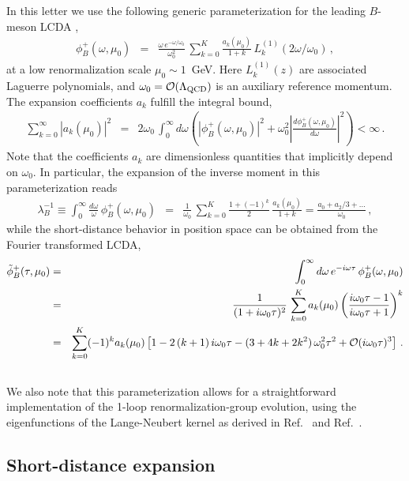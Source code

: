 \documentclass[a4paper,11pt]{article}
\begin{document}
In this letter we use the following generic parameterization for the leading $B$-meson LCDA \cite{Feldmann:2022uok},
\begin{eqnarray}
	\phi_B^+(\omega,\mu_0) &=& 
	\frac{\omega \, e^{-\omega/\omega_0}}{\omega_0^2} 
	\, \sum_{k=0}^K \frac{a_k(\mu_0)}{1+k} \, L_k^{(1)}(2\omega/\omega_0) \,,
 \label{eq:generic}
\end{eqnarray}
at a low renormalization scale $\mu_0 \sim 1$~GeV.
%
Here $L_k^{(1)}(z)$ are associated Laguerre polynomials, and $\omega_0 = {\cal O}(\Lambda_{\rm QCD})$ is an auxiliary reference momentum. The expansion coefficients $a_k$ fulfill the integral bound,
\begin{eqnarray}
	\sum_{k=0}^\infty |a_k(\mu_0)|^2 &=& 
	2\omega_0 \, \int_0^\infty d\omega 
	\left( \left|\phi_B^+(\omega,\mu_0) \right|^2 
	+ \omega_0^2 \left| \frac{d\phi_B^+(\omega,\mu_0)}{d\omega} \right|^2 \right) < \infty \,.
 \label{eq:bound}
\end{eqnarray}
Note that the coefficients $a_k$ are dimensionless quantities that implicitly depend on 
$\omega_0$.
%
In particular, the expansion of the inverse moment in this parameterization reads
\begin{eqnarray}
	\lambda_B^{-1} 
    \equiv \int_0^\infty\frac{d\omega}{\omega} \, \phi_B^+(\omega,\mu_0) &=& 
	\frac{1}{\omega_0} \, \sum_{k=0}^K \frac{1+(-1)^{k}}{2} \, 
	\frac{a_k(\mu_0)}{1+k} = \frac{a_0 + a_2/3 + \ldots}{\omega_0} \,,
 \label{eq:par_lambdaB}
\end{eqnarray}
while the short-distance behavior in position space can be obtained from the Fourier transformed LCDA,
\begin{eqnarray}
	\tilde \phi_B^+(\tau,\mu_0) 
 &=& \int_0^\infty d\omega \, e^{-i \omega \tau } \, \phi_B^+(\omega,\mu_0)
 \cr 
   &=& \frac{1}{(1+i\omega_0\tau)^2}
	\, \sum_{k=0}^K a_k(\mu_0) \left( \frac{i\omega_0\tau-1}{i\omega_0\tau+1} \right)^k  
	\cr 
	&=& \sum_{k=0}^K (-1)^k a_k(\mu_0) \left[ 1  
   - 2 \, (k+1) \, i \omega_0\tau - (3+4k +2k^2) \, \omega_0^2\tau^2 + {\cal O}(i\omega_0\tau)^3 \right] \,.
   \cr &&
   \label{phitau_ak}
\end{eqnarray}
We also note that this parameterization allows for a straightforward implementation of the 1-loop renormalization-group evolution, using the eigenfunctions of the Lange-Neubert kernel \cite{Lange:2003ff} as derived in Ref.~\cite{Bell:2013tfa} and Ref.~\cite{Braun:2014owa}.


\subsection{Short-distance expansion}
\end{document}
